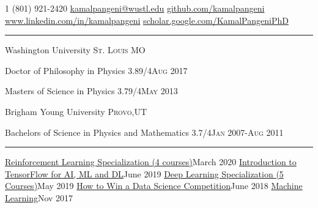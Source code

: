 \documentclass[10pt,letterpaper]{article}
\begin{document}
\newpage
{}

\noindent\textsmaller{+}1 (801) 921-2420\bull
\href{mailto:kamalpangeni@wustl.edu}{kamalpangeni@wustl.edu}\bull
\href{https://github.com/kamalpangeni}
{github.com/kamalpangeni}\\
\href{https://www.linkedin.com/in/kamal-pangeni-31242a29/}
{www.linkedin.com/in/kamalpangeni}\bull
\href{https://scholar.google.com/citations?user=MJPS73gAAAAJ&hl=en}
{scholar.google.com/\textsmaller{+}KamalPangeniPhD}
\hrule

\headedsection
{Washington University}
{\textsc{St. Louis MO}} {

\headedsubsection
{Doctor of Philosophy in Physics 3.89/4}{\textsc{Aug 2017}}
{}
{}

\headedsubsection
{Masters of Science in Physics 3.79/4}{\textsc{May 2013}}
{}{}}


\headedsection
{Brigham Young University}
{\textsc{Provo,UT}} {

\headedsubsection
{Bachelors of Science in Physics and Mathematics 3.7/4}{\textsc{Jan 2007-Aug 2011}}
{}
{\bodytext{}}
}

\hrule

\headedsubsection
{\href{https://www.coursera.org/account/accomplishments/specialization/86SNN7EEXUL2}{Reinforcement Learning Specialization (4 courses)}}{March 2020}{}
\headedsubsection
{\href{https://www.coursera.org/account/accomplishments/certificate/KFLEJGRZMYQZ}{Introduction to TensorFlow for AI, ML and DL}}{June 2019}{}
\headedsubsection
{\href{https://www.coursera.org/account/accomplishments/specialization/P8F8U69WUCVD}{Deep Learning Specialization (5 Courses)}}{May 2019} {}
\headedsubsection
{\href{https://www.coursera.org/account/accomplishments/verify/WAQ4WS7BCBDS}{How to Win a Data Science Competition}}{June 2018}{}
\headedsubsection
{\href{https://www.coursera.org/account/accomplishments/certificate/R3Q26XAHTCHD}{Machine Learning}}{Nov 2017}{}
\end{document}
